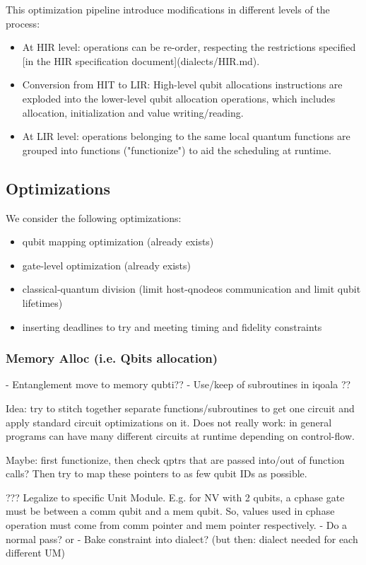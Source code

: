 This optimization pipeline introduce modifications in different levels of the process:
\begin{itemize}
\item At HIR level: operations can be re-order, respecting the restrictions specified
  [in the HIR specification document](dialects/HIR.md).
\item Conversion from HIT to LIR: High-level qubit allocations instructions are exploded
  into the lower-level qubit allocation operations, which includes allocation,
  initialization and value writing/reading.
\item At LIR level: operations belonging to the same local quantum functions are grouped
  into functions ("functionize") to aid the scheduling at runtime.
\end{itemize}


\subsection{Optimizations}
We consider the following optimizations:
\begin{itemize}
\item qubit mapping optimization (already exists)
\item gate-level optimization (already exists)
\item classical-quantum division (limit host-qnodeos communication and limit qubit lifetimes)
\item inserting deadlines to try and meeting timing and fidelity constraints
\end{itemize}


\subsubsection{Memory Alloc (i.e. Qbits allocation)}
- Entanglement move to memory qubti??
- Use/keep of subroutines in iqoala ??

Idea: try to stitch together separate functions/subroutines to get one circuit and apply standard circuit optimizations on it.
Does not really work: in general programs can have many different circuits at runtime depending on control-flow.

Maybe: first functionize, then check qptrs that are passed into/out of function calls? Then try to map these pointers to as few qubit IDs as possible.

??? Legalize to specific Unit Module. E.g. for NV with 2 qubits, a cphase gate must be between a comm qubit and a mem qubit. So, values used in cphase operation must come from comm pointer and mem pointer respectively. 
- Do a normal pass? or
- Bake constraint into dialect? (but then: dialect needed for each different UM)

